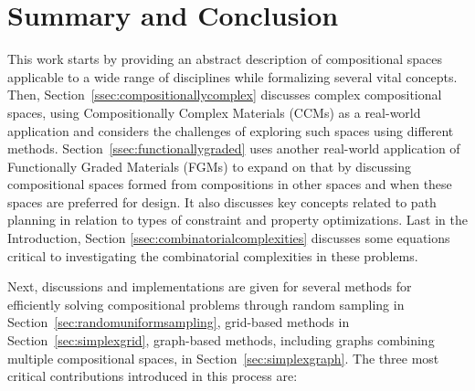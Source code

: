 \section{Summary and Conclusion} \label{sec:summary}

This work starts by providing an abstract description of compositional spaces applicable to a wide range of disciplines while formalizing several vital concepts. Then, Section~\ref{ssec:compositionallycomplex} discusses complex compositional spaces, using Compositionally Complex Materials (CCMs) as a real-world application and considers the challenges of exploring such spaces using different methods. Section~\ref{ssec:functionallygraded} uses another real-world application of Functionally Graded Materials (FGMs) to expand on that by discussing compositional spaces formed from compositions in other spaces and when these spaces are preferred for design. It also discusses key concepts related to path planning in relation to types of constraint and property optimizations. Last in the Introduction, Section \ref{ssec:combinatorialcomplexities} discusses some equations critical to investigating the combinatorial complexities in these problems.

Next, discussions and implementations are given for several methods for efficiently solving compositional problems through random sampling in Section~\ref{sec:randomuniformsampling}, grid-based methods in Section~\ref{sec:simplexgrid}, graph-based methods, including graphs combining multiple compositional spaces, in Section~\ref{sec:simplexgraph}. The three most critical contributions introduced in this process are:

